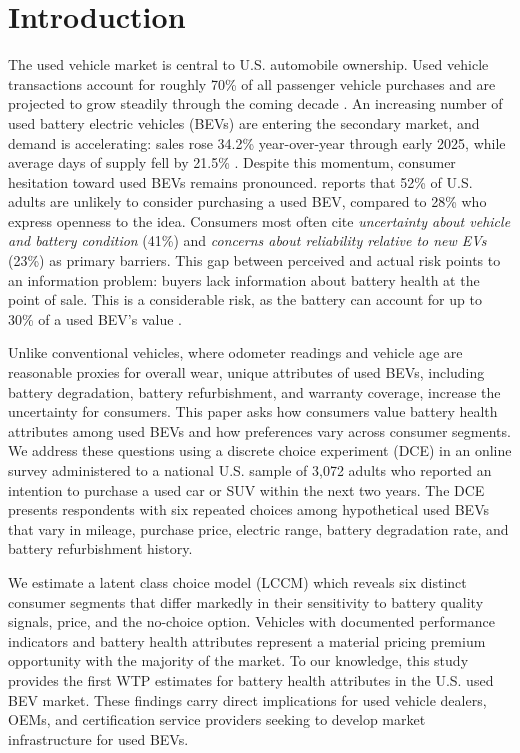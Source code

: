\documentclass[a4paper,fleqn]{cas-sc}   %
\begin{document}
\section{Introduction}
\label{section:intro}

The used vehicle market is central to U.S. automobile ownership. Used vehicle transactions account for roughly 70\% of all passenger vehicle purchases and are projected to grow steadily through the coming decade \parencite{marketresearchfutureUnitedStatesUsed2025}. An increasing number of used battery electric vehicles (BEVs) are entering the secondary market, and demand is accelerating: sales rose 34.2\% year-over-year through early 2025, while average days of supply fell by 21.5\% \parencite{coxautomotiveinc.EVMarketMonitor2025}. Despite this momentum, consumer hesitation toward used BEVs remains pronounced. \textcite{fernandesUSUnderstandingConsumer2023} reports that 52\% of U.S. adults are unlikely to consider purchasing a used BEV, compared to 28\% who express openness to the idea. Consumers most often cite \textit{uncertainty about vehicle and battery condition} (41\%) and \textit{concerns about reliability relative to new EVs} (23\%) as primary barriers. This gap between perceived and actual risk points to an information problem: buyers lack information about battery health at the point of sale. This is a considerable risk, as the battery can account for up to 30\% of a used BEV's value \parencite{boudwayBatteriesElectricCars2020}.

Unlike conventional vehicles, where odometer readings and vehicle age are reasonable proxies for overall wear, unique attributes of used BEVs, including battery degradation, battery refurbishment, and warranty coverage, increase the uncertainty for consumers. This paper asks how consumers value battery health attributes among used BEVs and how preferences vary across consumer segments. We address these questions using a discrete choice experiment (DCE) in an online survey administered to a national U.S. sample of 3,072 adults who reported an intention to purchase a used car or SUV within the next two years. The DCE presents respondents with six repeated choices among hypothetical used BEVs that vary in mileage, purchase price, electric range, battery degradation rate, and battery refurbishment history.

We estimate a latent class choice model (LCCM) which reveals six distinct consumer segments that differ markedly in their sensitivity to battery quality signals, price, and the no-choice option. Vehicles with documented performance indicators and battery health attributes represent a material pricing premium opportunity with the majority of the market. To our knowledge, this study provides the first WTP estimates for battery health attributes in the U.S. used BEV market. These findings carry direct implications for used vehicle dealers, OEMs, and certification service providers seeking to develop market infrastructure for used BEVs.
\end{document}
